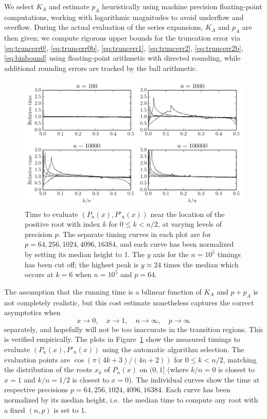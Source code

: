 \documentclass{siamart0216}
\begin{document}
We select $K_A$ and estimate $p_A$ heuristically using machine precision
floating-point computations, working with logarithmic magnitudes to
avoid underflow and overflow.
During the actual evaluation of the series expansions, $K_A$ and $p_A$ are then given;
we compute rigorous upper bounds
for the truncation error via
\eqref{eq:truncerr0}, \eqref{eq:truncerr0b}, \eqref{eq:truncerr1},
\eqref{eq:truncerr2}, \eqref{eq:truncerr2b}, \eqref{eq:binbound}
using floating-point arithmetic with directed rounding,
while additional rounding errors are tracked by the ball arithmetic.

\begin{figure}[h!]
\includegraphics[width=\textwidth]{timeplot}
\caption{Time to evaluate $(P_n(x), P'_n(x))$ near the location of the positive root with index $k$ for $0 \le k < n/2$, at varying levels of precision $p$.
The separate timing curves in each plot are for $p = 64, 256, 1024, 4096, 16384$, and each curve has been normalized by setting its median height to 1. The $y$ axis for the $n = 10^5$ timings has been cut off; the highest peak is $y \approx 24$ times the median which occurs at $k = 6$ when $n = 10^5$ and $p = 64$.}
\label{fig:timeplot}
\end{figure}

The assumption that the running time is a bilinear function of $K_A$ and $p + p_A$ is not completely realistic, but this cost estimate nonetheless captures the correct asymptotics when
$$x \to 0, \quad x \to 1, \quad n \to \infty, \quad p \to \infty$$
separately, and hopefully will not be too inaccurate in the transition regions. This is verified empirically. The plots in Figure~\ref{fig:timeplot} show the measured
timings to evaluate $(P_n(x), P'_n(x))$ using the automatic algorithm selection.
The evaluation points are $\cos(\pi (4k+3)/(4n+2))$ for $0 \le k < n/2$, matching
the distribution of the roots $x_k$ of $P_n(x)$ on $(0,1]$ (where $k/n = 0$ is closest to $x = 1$ and $k/n = 1/2$ is closest to $x = 0$).
The individual curves show the time at respective precisions $p = 64, 256, 1024, 4096, 16384$.
Each curve has been normalized by its median height, i.e.\ the median time to compute any root with a fixed $(n,p)$ is set to 1.
\end{document}
